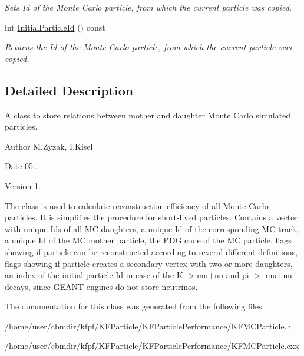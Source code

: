 \begin{DoxyCompactItemize}
\begin{DoxyCompactList}\small\item\em Sets Id of the Monte Carlo particle, from which the current particle was copied. \end{DoxyCompactList}\item 
int \hyperlink{classKFMCParticle_af86d0b3cd56d0bef0aa9cbc651ee2e1a}{Initial\+Particle\+Id} () const \hypertarget{classKFMCParticle_af86d0b3cd56d0bef0aa9cbc651ee2e1a}{}\label{classKFMCParticle_af86d0b3cd56d0bef0aa9cbc651ee2e1a}

\begin{DoxyCompactList}\small\item\em Returns the Id of the Monte Carlo particle, from which the current particle was copied. \end{DoxyCompactList}\end{DoxyCompactItemize}


\subsection{Detailed Description}
A class to store relations between mother and daughter Monte Carlo simulated particles. 

\begin{DoxyAuthor}{Author}
M.\+Zyzak, I.\+Kisel 
\end{DoxyAuthor}
\begin{DoxyDate}{Date}
05.. 
\end{DoxyDate}
\begin{DoxyVersion}{Version}
1.
\end{DoxyVersion}
The class is used to calculate reconstruction efficiency of all Monte Carlo particles. It is simplifies the procedure for short-\/lived particles. Contains a vector with unique Ids of all MC daughters, a unique Id of the corresponding MC track, a unique Id of the MC mother particle, the P\+DG code of the MC particle, flags showing if particle can be reconstructed according to several different definitions, flags showing if particle creates a secondary vertex with two or more daughters, an index of the initial particle Id in case of the K-\/$>$mu+nu and pi-\/$>$ mu+nu decays, since G\+E\+A\+NT engines do not store neutrinos. 

The documentation for this class was generated from the following files\+:\begin{DoxyCompactItemize}
\item 
/home/user/cbmdir/kfpf/\+K\+F\+Particle/\+K\+F\+Particle\+Performance/K\+F\+M\+C\+Particle.\+h\item 
/home/user/cbmdir/kfpf/\+K\+F\+Particle/\+K\+F\+Particle\+Performance/K\+F\+M\+C\+Particle.\+cxx\end{DoxyCompactItemize}
